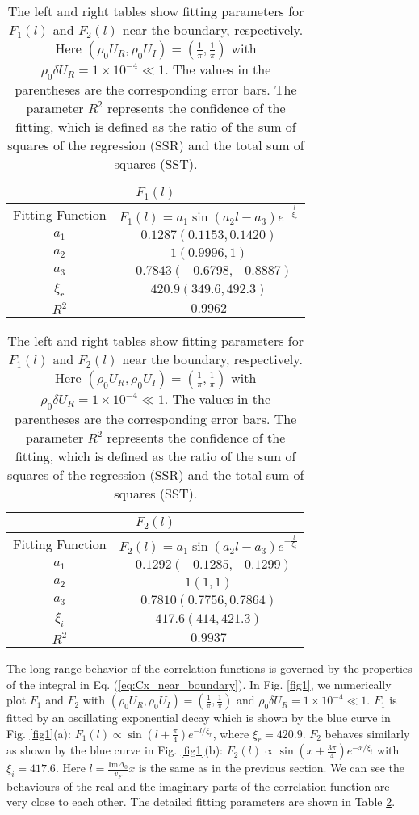 \documentclass[aps,onecolumn,nofootinbib,superscriptaddress,notitlepage,longbibliography]{revtex4-1}
\begin{document}
\begin{table}
	\begin{tabular}{|c|c|}
		\hline 
		\multicolumn{2}{|c|}{$F_{1}(l)$}\tabularnewline		
		\hline
		\hline 
		Fitting Function & $F_1(l)=a_{1}\sin(a_{2}l-a_{3})e^{-\frac{l}{\xi_{r}}}$\tabularnewline
		\hline 
		$a_{1}$ & $0.1287(0.1153,0.1420)$\tabularnewline
		\hline 
		$a_{2}$ & $1(0.9996,1)$\tabularnewline
		\hline 
		$a_{3}$ & $-0.7843(-0.6798,-0.8887)$\tabularnewline
		\hline 
		$\xi_{r}$ & $420.9(349.6,492.3)$\tabularnewline
		\hline 
		$R^{2}$ & $0.9962$\tabularnewline
		\hline 
	\end{tabular}%
	\begin{tabular}{|c|c|}
		\hline 
		\multicolumn{2}{|c|}{$F_{2}(l)$}\tabularnewline
		\hline
		\hline 
		Fitting Function & $F_2(l)=a_{1}\sin(a_{2}l-a_{3})e^{-\frac{l}{\xi_i}}$\tabularnewline
		\hline 
		$a_{1}$ & $-0.1292(-0.1285,-0.1299)$\tabularnewline
		\hline 
		$a_{2}$ & $1(1,1)$\tabularnewline
		\hline 
		$a_{3}$ & $0.7810(0.7756,0.7864)$\tabularnewline
		\hline 
		$\xi_{i}$ & $417.6(414,421.3)$\tabularnewline
		\hline 
		$R^{2}$ & $0.9937$\tabularnewline
		\hline 
	\end{tabular}
	
	\caption{The left and right tables show fitting parameters for $F_1(l)$ and $F_2(l)$ near the boundary, respectively. Here $(\rho_{0}U_{R},\rho_{0}U_{I})=(\frac{1}{\pi},\frac{1}{\pi})$ with $\rho_{0}\delta U_{R}=1\times10^{-4}\ll1$. The values in the parentheses are the corresponding error bars. The parameter $R^2$ represents the confidence of the fitting, which is defined as the ratio of the sum of squares of the regression (SSR) and the total sum of squares (SST).}
	\label{Fitting_table_1}
\end{table}
The long-range behavior of the correlation functions is governed by the properties of the integral in Eq. (\ref{eq:Cx_near_boundary}). In Fig. \ref{fig1}, we numerically plot $F_1$ and $F_2$ with $(\rho_{0}U_{R},\rho_{0}U_{I})=(\frac{1}{\pi},\frac{1}{\pi})$ and $\rho_{0}\delta U_{R}=1\times10^{-4}\ll1$. $F_1$ is fitted by an oscillating exponential decay  which is shown by the blue curve
in Fig. \ref{fig1}(a): $F_1(l)\propto\sin(l+\frac{\pi}{4})e^{-l/\xi_{r}}$,
where $\xi_{r}=420.9$. $F_2$ behaves similarly as
shown by the blue curve in Fig. \ref{fig1}(b): $F_2(l) \propto\sin(x+\frac{3\pi}{4})e^{-x/\xi_{i}}$
with $\xi_{i}=417.6$. Here $l=\frac{\text{Im}\Delta_0}{v_F}x$ is the same as in the previous section. We can see the behaviours of the real and the
imaginary parts of the correlation function are very close
to each other. The detailed fitting parameters are shown in Table \ref{Fitting_table_1}.
\end{document}
